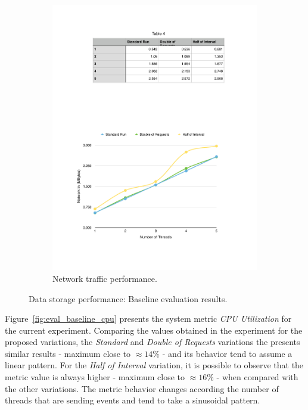 \begin{figure}[ht!]
\begin{subfigure}{.5\textwidth}
  \includegraphics[width=\linewidth]{./images/network_1_lap}
  \caption{Network traffic performance.}
  \label{fig:eval_baseline_network}
\end{subfigure}
\caption[Data storage: Baseline results.]{Data storage performance: Baseline evaluation results.}
\label{fig:eval_baseline_results}
\end{figure}

Figure~\ref{fig:eval_baseline_cpu} presents the system metric \textit{CPU Utilization} for the current
experiment. Comparing the values obtained in the experiment for the proposed variations, the
\textit{Standard} and \textit{Double of Requests} variations the presents similar results -
maximum close to $\approx14\%$ - and its behavior tend to assume a linear pattern. For the \textit{Half of Interval}
variation, it is possible to observe that the metric value is always higher - maximum close to $\approx16\%$ -
when compared with the other variations. The metric behavior changes according the number of threads
that are sending events and tend to take a sinusoidal pattern.\\


